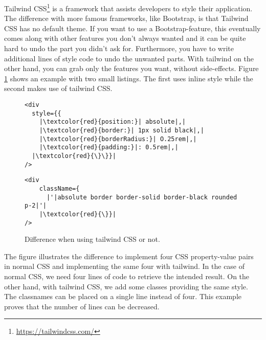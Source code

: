 Tailwind CSS\footnote{\url{https://tailwindcss.com/}} is a framework that assists developers to style their application. The difference with more famous frameworks, like Bootstrap, is that Tailwind CSS has no default theme. If you want to use a Bootstrap-feature, this eventually comes along with other features you don't always wanted and it can be quite hard to undo the part you didn't ask for. Furthermore, you have to write additional lines of style code to undo the unwanted parts. With tailwind on the other hand, you can grab only the features you want, without side-effects. Figure \ref{fig:examplecode-tailwindcss} shows an example with two small listings. The first uses inline style while the second makes use of tailwind CSS.

\begin{figure}[H]
	\begin{minipage}[b]{0.5\textwidth}
 		\centering
  		\begin{verbatim}
<div
  style={{
    |\textcolor{red}{position:}| absolute|,|
    |\textcolor{red}{border:}| 1px solid black|,|
    |\textcolor{red}{borderRadius:}| O.25rem|,|
    |\textcolor{red}{padding:}|: 0.5rem|,|
  |\textcolor{red}{\}\}}|
/>
		\end{verbatim}
		\label{lst:no-tailwind}
	\end{minipage}
 	\begin{minipage}[b]{0.5\textwidth}
  		\centering
		\begin{verbatim}
<div
    className={
      |'|absolute border border-solid border-black rounded p-2|'|
    |\textcolor{red}{\}}|
/>
		\end{verbatim}
		\label{lst:tailwind}
 	\end{minipage}
	\caption{Difference when using tailwind CSS or not.}
	\label{fig:examplecode-tailwindcss}
\end{figure}

The figure illustrates the difference to implement four CSS property-value pairs in normal CSS and implementing the same four with tailwind. In the case of normal CSS, we need four lines of code to retrieve the intended result. On the other hand, with tailwind CSS, we add some classes providing the same style. The classnames can be placed on a single line instead of four. This example proves that the number of lines can be decreased.\\

